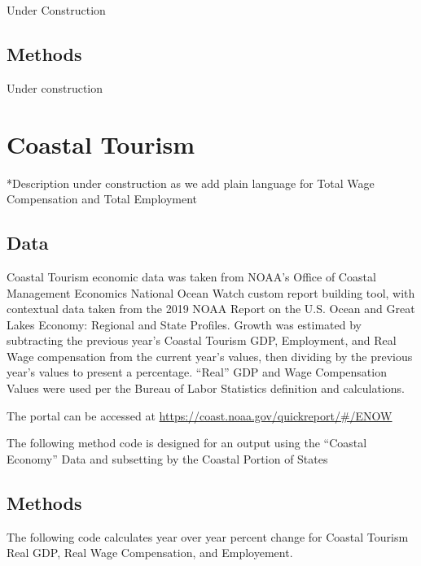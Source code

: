 \documentclass[
]{book}
\begin{document}
Under Construction

\hypertarget{methods-11}{%
\section{Methods}\label{methods-11}}

Under construction

\hypertarget{coastal-tourism}{%
\chapter{Coastal Tourism}\label{coastal-tourism}}

*Description under construction as we add plain language for Total Wage Compensation and Total Employment

\hypertarget{data-12}{%
\section{Data}\label{data-12}}

Coastal Tourism economic data was taken from NOAA's Office of Coastal Management Economics National Ocean Watch custom report building tool, with contextual data taken from the 2019 NOAA Report on the U.S. Ocean and Great Lakes Economy: Regional and State Profiles. Growth was estimated by subtracting the previous year's Coastal Tourism GDP, Employment, and Real Wage compensation from the current year's values, then dividing by the previous year's values to present a percentage. ``Real'' GDP and Wage Compensation Values were used per the Bureau of Labor Statistics definition and calculations.

The portal can be accessed at \url{https://coast.noaa.gov/quickreport/\#/ENOW}

The following method code is designed for an output using the ``Coastal Economy'' Data and subsetting by the Coastal Portion of States

\hypertarget{methods-12}{%
\section{Methods}\label{methods-12}}

The following code calculates year over year percent change for Coastal Tourism Real GDP, Real Wage Compensation, and Employement.
\end{document}
